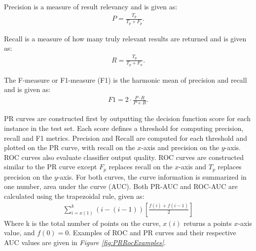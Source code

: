 \documentclass[ms]{nuthesis}
\begin{document}
Precision is a measure of result relevancy and is given as: %
\FloatBarrier
\begin{equation}
\label{eq:precision}
\begin{aligned}
P = \frac{T_p}{T_p+F_p}.
\end{aligned}
\end{equation}
\FloatBarrier

Recall is a measure of how many truly relevant results are returned and is given as: %
\FloatBarrier
\begin{equation}
\label{eq:recall}
\begin{aligned}
R = \frac{T_p}{T_p+F_n}.
\end{aligned}
\end{equation}
\FloatBarrier

The F-measure or F1-measure (F1) is the harmonic mean of precision and recall and is given as: %
\FloatBarrier
\begin{equation}
\label{eq:fmes}
\begin{aligned}
F1 = 2\cdot \frac{P \cdot R}{P+R}.
\end{aligned}
\end{equation}
\FloatBarrier

\par PR curves are constructed first by outputting the decision function score for each instance
in the test set. Each score defines a threshold for computing precision, recall and F1 metrics.
Precision and Recall are computed for each threshold and plotted on the PR curve,
with recall on the $x$-axis and precision on the $y$-axis. ROC curves also evaluate classifier output
quality. ROC curves are constructed similar to the PR curve except $F_p$ replaces recall on the
 $x$-axis and $T_p$ replaces precision on the $y$-axis. For both curves, the curve information is
 summarized in one number, area under the curve (AUC). Both PR-AUC and ROC-AUC are calculated using
 the trapezoidal rule, given as:
\FloatBarrier
\begin{equation}
\label{eq:trapRule}
\begin{aligned}
\sum_{i=x(1)}^{k} (i-(i-1)) \left[\frac{f(i) + f(i-1)}{2} \right]
\end{aligned}
\end{equation}
\FloatBarrier
Where k is the total number of points on the curve, $x(i)$ returns a points $x$-axis value,
 and $f(0)=0$. Examples of ROC and PR curves and their
respective AUC values are given in \textit{Figure \ref{fig:PRRocExamples}}.
\end{document}
